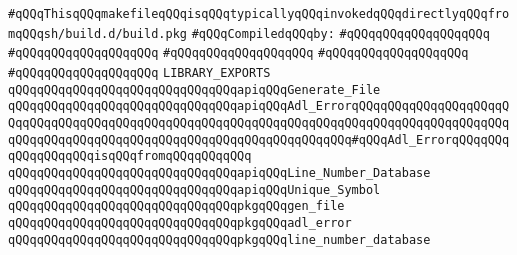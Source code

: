 \label{src/lib/compiler/back/low/tools/line-number-database.lib}
\verb|#qQQqThisqQQqmakefileqQQqisqQQqtypicallyqQQqinvokedqQQqdirectlyqQQqfromqQQqsh/build.d/build.pkg|\newline
\newline
\verb|#qQQqCompiledqQQqby:|\newline
\verb|#qQQqqQQqqQQqqQQqqQQq|\newline
\verb|#qQQqqQQqqQQqqQQqqQQq|\newline
\verb|#qQQqqQQqqQQqqQQqqQQq|\newline
\verb|#qQQqqQQqqQQqqQQqqQQq|\newline
\verb|#qQQqqQQqqQQqqQQqqQQq|\newline
\newline
\verb|LIBRARY_EXPORTS|\newline
\newline
\verb|qQQqqQQqqQQqqQQqqQQqqQQqqQQqqQQqapiqQQqGenerate_File|\newline
\verb|qQQqqQQqqQQqqQQqqQQqqQQqqQQqqQQqapiqQQqAdl_ErrorqQQqqQQqqQQqqQQqqQQqqQQqqQQqqQQqqQQqqQQqqQQqqQQqqQQqqQQqqQQqqQQqqQQqqQQqqQQqqQQqqQQqqQQqqQQqqQQqqQQqqQQqqQQqqQQqqQQqqQQqqQQqqQQqqQQqqQQqqQQq#qQQqAdl_ErrorqQQqqQQqqQQqqQQqqQQqisqQQqfromqQQqqQQqqQQq|\newline
\verb|qQQqqQQqqQQqqQQqqQQqqQQqqQQqqQQqapiqQQqLine_Number_Database|\newline
\verb|qQQqqQQqqQQqqQQqqQQqqQQqqQQqqQQqapiqQQqUnique_Symbol|\newline
\newline
\verb|qQQqqQQqqQQqqQQqqQQqqQQqqQQqqQQqpkgqQQqgen_file|\newline
\verb|qQQqqQQqqQQqqQQqqQQqqQQqqQQqqQQqpkgqQQqadl_error|\newline
\verb|qQQqqQQqqQQqqQQqqQQqqQQqqQQqqQQqpkgqQQqline_number_database|\newline
